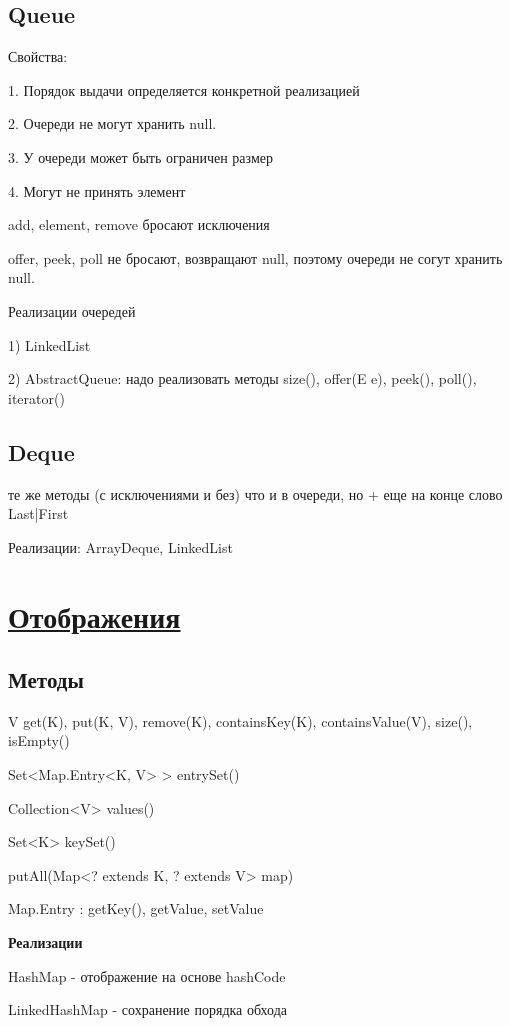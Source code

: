 \documentclass{article}
\begin{document}
\subsection{Queue}

Свойства:

1. Порядок выдачи определяется конкретной реализацией

2. Очереди не могут хранить null.

3. У очереди может быть ограничен размер

4. Могут не принять элемент

add, element, remove бросают исключения

offer, peek, poll не бросают, возвращают null, поэтому очереди не согут хранить null.

Реализации очередей

1) LinkedList

2) AbstractQueue: надо реализовать методы size(), offer(E e), peek(), poll(), iterator()

\subsection{Deque}

те же методы (с исключениями и без) что и в очереди, но + еще на конце слово Last|First

Реализации: ArrayDeque, LinkedList


\section{\underline{Отображения}}

\subsection{Методы}

V get(K), put(K, V), remove(K), containsKey(K), containsValue(V), size(), isEmpty()

Set<Map.Entry<K, V> > entrySet()

Collection<V> values()

Set<K> keySet()

putAll(Map<? extends K, ? extends V> map)

Map.Entry : getKey(), getValue, setValue

\textbf{Реализации}

HashMap - отображение на основе hashCode

LinkedHashMap - сохранение порядка обхода
\end{document}
